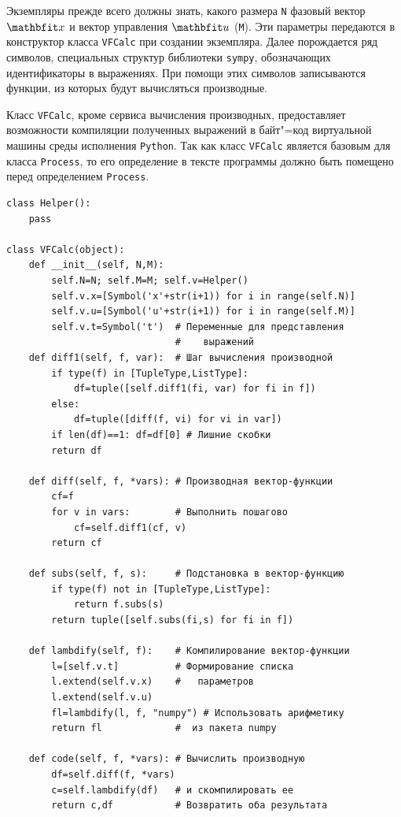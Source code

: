 \documentclass[a4paper,14pt, openany, twoside, final]{extbook} %
\begin{document}
Экземпляры прежде всего должны знать, какого размера \texttt{N} фазовый вектор $\vecx$ и вектор управления $\vecu$ (\texttt{M}).  Эти параметры передаются в конструктор класса \texttt{VFCalc} при создании экземпляра.  Далее порождается ряд символов, специальных структур библиотеки \texttt{sympy}, обозначающих идентификаторы в выражениях.  При помощи этих символов записываются функции, из которых будут вычисляться производные.

Класс \texttt{VFCalc}, кроме сервиса вычисления производных, предоставляет возможности компиляции полученных выражений в байт"=код виртуальной машины среды исполнения \texttt{Python}.  Так как класс \texttt{VFCalc} является базовым для класса \texttt{Process}, то его определение в тексте программы должно быть помещено перед определением \texttt{Process}.

\begin{verbatim}
class Helper():
    pass

class VFCalc(object):
    def __init__(self, N,M):
        self.N=N; self.M=M; self.v=Helper()
        self.v.x=[Symbol('x'+str(i+1)) for i in range(self.N)]
        self.v.u=[Symbol('u'+str(i+1)) for i in range(self.M)]
        self.v.t=Symbol('t')  # Переменные для представления
                              #    выражений
    def diff1(self, f, var):  # Шаг вычисления производной
        if type(f) in [TupleType,ListType]:
            df=tuple([self.diff1(fi, var) for fi in f])
        else:
            df=tuple([diff(f, vi) for vi in var])
        if len(df)==1: df=df[0] # Лишние скобки
        return df

    def diff(self, f, *vars): # Производная вектор-функции
        cf=f
        for v in vars:        # Выполнить пошагово
            cf=self.diff1(cf, v)
        return cf

    def subs(self, f, s):     # Подстановка в вектор-функцию
        if type(f) not in [TupleType,ListType]:
            return f.subs(s)
        return tuple([self.subs(fi,s) for fi in f])

    def lambdify(self, f):    # Компилирование вектор-функции
        l=[self.v.t]          # Формирование списка
        l.extend(self.v.x)    #   параметров
        l.extend(self.v.u)
        fl=lambdify(l, f, "numpy") # Использовать арифметику
        return fl             #  из пакета numpy

    def code(self, f, *vars): # Вычислить производную
        df=self.diff(f, *vars)
        c=self.lambdify(df)   # и скомпилировать ее
        return c,df           # Возвратить оба результата
\end{verbatim}
\end{document}
